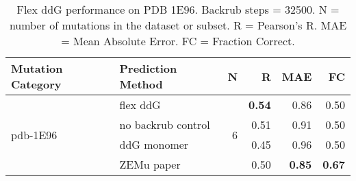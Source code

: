 \begin{table}
  \begin{tabular}{llrrrr}
\toprule
Mutation Category &   Prediction Method &  N &    R &  MAE &   FC \\
\midrule
 \multirow{ 4}{*}{pdb-1E96} & flex ddG & \multirow{ 4}{*}{6} & \textbf{0.54} & 0.86 & 0.50  \\
 & no backrub control & & 0.51 & 0.91 & 0.50  \\
 & ddG monomer & & 0.45 & 0.96 & 0.50  \\
 & ZEMu paper & & 0.50 & \textbf{0.85} & \textbf{0.67}  \\
\bottomrule
\end{tabular}
  \caption[Flex ddG performance on PDB 1E96]{
    Flex ddG performance on PDB 1E96. Backrub steps = 32500. N = number of mutations in the dataset or subset. R = Pearson's R. MAE = Mean Absolute Error. FC = Fraction Correct.
  } \label{tab:table-pdb-1E96}
\end{table}
